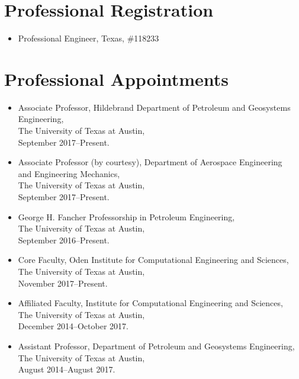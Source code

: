 \section*{Professional Registration}

\begin{itemize}
    \item Professional Engineer, Texas, \#118233
\end{itemize}


\ifdefined\ispdf
\section*{Professional Appointments}

\begin{itemize}
    \item Associate Professor, Hildebrand Department of Petroleum and Geosystems Engineering, \\ 
          The University of Texas at Austin, \\
          September 2017--Present. 

    \item Associate Professor (by courtesy), Department of Aerospace Engineering \\ 
          and Engineering Mechanics, \\ 
          The University of Texas at Austin, \\
          September 2017--Present. 

    \item George H. Fancher Professorship in Petroleum Engineering, \\ 
          The University of Texas at Austin, \\
          September 2016--Present. 

    \item Core Faculty, Oden Institute for Computational Engineering and Sciences, \\ 
          The University of Texas at Austin, \\
          November 2017--Present. 

    \item Affiliated Faculty, Institute for Computational Engineering and Sciences, \\ 
          The University of Texas at Austin, \\
          December 2014--October 2017. 

    \item Assistant Professor, Department of Petroleum and Geosystems Engineering, \\ 
          The University of Texas at Austin, \\
          August 2014--August 2017. 


\end{itemize}
